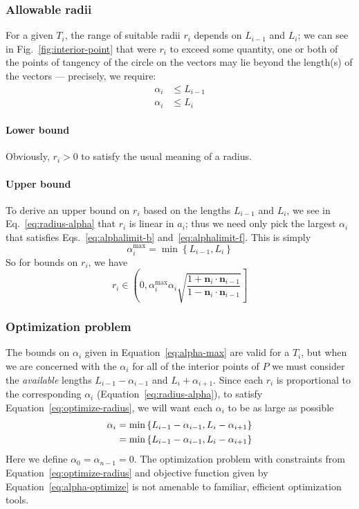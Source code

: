 \documentclass{article}
\begin{document}
\subsubsection{Allowable radii}
\label{sec:allowable-radii}
%
For a given $T_{i}$, the range of suitable radii $r_{i}$ depends on $L_{i-1}$ and $L_i$; we can see in Fig.~\ref{fig:interior-point} that were $r_{i}$ to exceed some quantity, one or both of the points of tangency of the circle on the vectors may lie beyond the length(s) of the vectors --- precisely, we require:
%
\begin{align}
  \label{eq:alphalimit-b}
  \alpha_i &\le L_{i-1}\\
  \label{eq:alphalimit-f}
  \alpha_i &\le L_{i}
\end{align}
%
\paragraph{Lower bound}
%
Obviously, $r_i > 0$ to satisfy the usual meaning of a radius.
%
\paragraph{Upper bound}
%
To derive an upper bound on $r_{i}$ based on the lengths $L_{i-1}$ and $L_i$, we see in Eq.~\eqref{eq:radius-alpha} that $r_{i}$ is linear in $a_{i}$; thus we need only pick the largest $\alpha_i$ that satisfies Eqs.~\eqref{eq:alphalimit-b} and~\eqref{eq:alphalimit-f}.  This is simply
%
\begin{equation}
  \label{eq:alpha-max}
  \alpha^{\max}_i = \min \left\{L_{i-1}, L_{i}\right\}
\end{equation}
%
So for bounds on $r_{i}$, we have
%
\begin{equation}
  \label{eq:rbounds}
  r_{i} \in \left(0, \alpha^{\max}_i \alpha_i\sqrt{\frac{1+\mathbf{n}_i\cdot \mathbf{n}_{i-1}}{1-\mathbf{n}_i\cdot \mathbf{n}_{i-1}}}\right]
\end{equation}
%
\subsubsection{Optimization problem}
\label{sec:optimization}
%
The bounds on $\alpha_i$ given in Equation~\eqref{eq:alpha-max} are valid for a $T_{i}$, but when we are concerned with the $\alpha_i$ for all of the interior points of $P$ we must consider the \emph{available} lengths $L_{i-1}-\alpha_{i-1}$ and $L_{i}+\alpha_{i+1}$.  Since each $r_{i}$ is proportional to the corresponding $\alpha_i$ (Equation~\eqref{eq:radius-alpha}), to satisfy Equation~\eqref{eq:optimize-radius}, we will want each $\alpha_i$ to be as large as possible
%
\begin{align}
  \notag
  \alpha_i &= \min \left\{L_{i-1}-\alpha_{i-1}, L_{i}-\alpha_{i+1}\right\} \\
  \label{eq:alpha-optimize}
  &= \min \left\{L_{i-1}-\alpha_{i-1}, L_{i}-\alpha_{i+1}\right\}
\end{align}
%
Here we define $\alpha_0 = \alpha_{n-1} = 0$.  The optimization problem with constraints from Equation~\eqref{eq:optimize-radius} and objective function given by Equation~\eqref{eq:alpha-optimize} is not amenable to familiar, efficient optimization tools.
%
\end{document}
